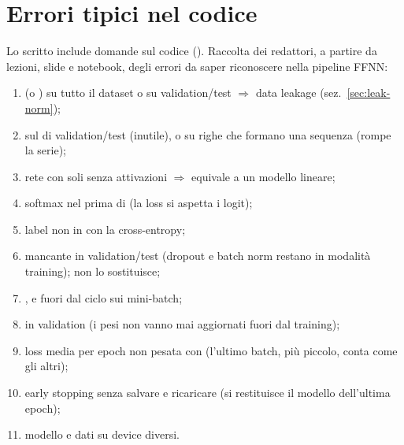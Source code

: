 \section{Errori tipici nel codice}
\begin{attenzione}
Lo scritto include domande sul codice (). Raccolta dei redattori, a partire da lezioni, slide e notebook, degli errori da saper riconoscere nella pipeline FFNN:
\begin{enumerate}
  \item {} (o ) su tutto il dataset o su validation/test $\Rightarrow$ data leakage
        (sez.~\ref{sec:leak-norm});
  \item {} sul  di validation/test (inutile), o su righe che formano una sequenza (rompe la serie);
  \item rete con soli  senza attivazioni $\Rightarrow$ equivale a un modello lineare;
  \item softmax nel  prima di  (la loss si aspetta i logit);
  \item label non in  con la cross-entropy;
  \item {} mancante in validation/test (dropout e batch norm restano in modalità training); 
        non lo sostituisce;
  \item {},  e  fuori dal ciclo sui mini-batch;
  \item {} in validation (i pesi non vanno mai aggiornati fuori dal training);
  \item loss media per epoch non pesata con  (l'ultimo batch, più piccolo, conta come gli altri);
  \item early stopping senza salvare e ricaricare  (si restituisce il modello dell'ultima epoch);
  \item modello e dati su device diversi.
\end{enumerate}
\end{attenzione}

